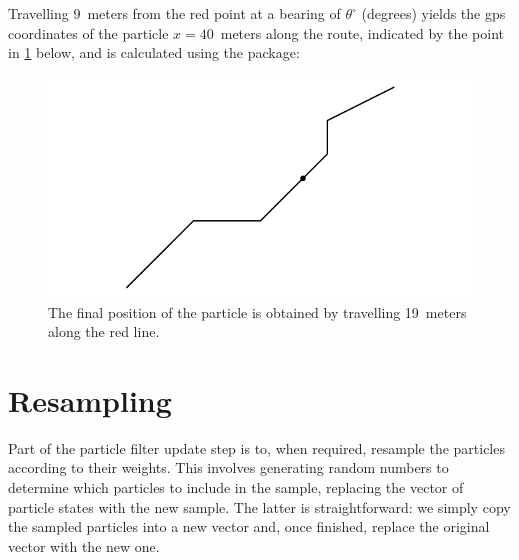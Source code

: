 Travelling 9~meters from the red point at a bearing of $\theta^\circ$ (degrees) yields the \gls{gps} coordinates of the particle $x=40$~meters along the route, indicated by the point in \cref{fig:app:measure_step3} below, and is calculated using the  package:
\begin{knitrout}\small
{}\color{fgcolor}\begin{kframe}
\begin{alltt}
 \hlkwb{<-} \hlopt{::}
\end{alltt}
\end{kframe}
\end{knitrout}

\begin{knitrout}\small
{}\color{fgcolor}\begin{figure}[h]

{\centering \includegraphics[width=.6\textwidth]{figure/app:measure_step3-1} 

}

\caption[The final position of the particle is obtained by travelling 19~meters along the red line]{The final position of the particle is obtained by travelling 19~meters along the red line.}\label{fig:app:measure_step3}
\end{figure}


\end{knitrout}

\section{Resampling}
\label{app:particle-resampling}

Part of the particle filter update step is to, when required, resample the particles according to their weights. This involves generating random numbers to determine which particles to include in the sample, replacing the vector of particle states with the new sample. The latter is straightforward: we simply copy the sampled particles into a new vector and, once finished, replace the original vector with the new one.


